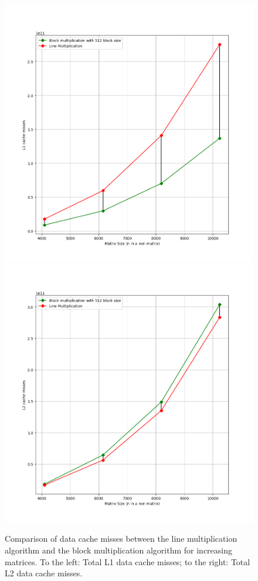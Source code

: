 \documentclass{report}
\begin{document}
				\begin{figure}[H]
					\begin{adjustbox}{center}
						\includegraphics[scale=0.4]{cpp_line_block_l1.png}
						\includegraphics[scale=0.4]{cpp_line_block_l2.png}
					\end{adjustbox}
					\caption{Comparison of data cache misses between the line multiplication algorithm and the block multiplication algorithm for increasing matrices. To the left: Total L1 data cache misses; to the right: Total L2 data cache misses.}
				\end{figure}
			
\end{document}
